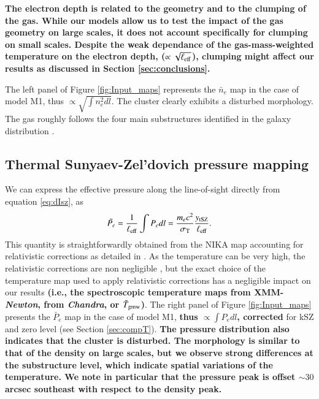 \documentclass[twocolumn,traditabstract]{aa}
\begin{document}
{\bf The electron depth is related to the geometry and to the clumping of the gas. While our models allow us to test the impact of the gas geometry on large scales, it does not account specifically for clumping on small scales. Despite the weak dependance of the gas-mass-weighted temperature on the electron depth, ($\propto \sqrt{\ell_{\rm eff}}$), clumping might affect our results as discussed in Section \ref{sec:conclusions}.

The left panel of Figure \ref{fig:Input_maps} represents the $\bar{n}_e$ map in the case of model M1, thus $\propto \sqrt{\int n_e^2 dl}$. The cluster clearly exhibits a disturbed morphology. The gas roughly follows the four main substructures identified in the galaxy distribution \citep{Ma2009}.}

\subsection{Thermal Sunyaev-Zel'dovich pressure mapping}
We can express the effective pressure along the line-of-sight directly from equation \ref{eq:dIsz}, as
\begin{equation}
	\bar{P_e} = \frac{1}{\ell_{\rm eff}} \int P_e dl = \frac{m_e c^2}{\sigma_{\rm T}} \frac{y_{\rm tSZ}}{\ell_{\rm eff}}.
\label{eq:pseudo_p}
\end{equation}
This quantity is straightforwardly obtained from the NIKA map accounting for relativistic corrections as detailed in \cite{Adam2016b}. As the temperature can be very high, the relativistic corrections are non negligible \citep{Pointecouteau1998,Itoh2003}, but the exact choice of the temperature map used to apply relativistic corrections has a negligible impact on our results {\bf (i.e., the spectroscopic temperature maps from XMM-\textit{Newton}, from \textit{Chandra},  or $\bar{T}_{\rm gmw}$)}. The right panel of Figure \ref{fig:Input_maps} presents the $\bar{P}_e$ map in the case of model M1, {\bf thus $\propto \int P_e dl$, corrected} for kSZ and zero level (see Section \ref{sec:compT}). {\bf The pressure distribution also indicates that the cluster is disturbed. The morphology is similar to that of the density on large scales, but we observe strong differences at the substructure level, which indicate spatial variations of the temperature. We note in particular that the pressure peak is offset $\sim 30$ arcsec southeast with respect to the density peak.}
\end{document}
